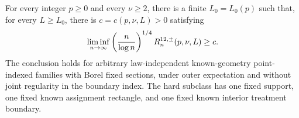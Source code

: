For every integer \(p\geq0\) and every \(\nu\geq2\), there is a finite \(L_0=L_0(p)\) such that, for every \(L\geq L_0\), there is \(c=c(p,\nu,L)>0\) satisfying
\[
 \liminf_{n\to\infty}\left({n\over\log n}\right)^{1/4}R^{12,\pm}_n(p,\nu,L)\geq c.
\]
The conclusion holds for arbitrary law-independent known-geometry point-indexed families with Borel fixed sections, under outer expectation and without joint regularity in the boundary index.  The hard subclass has one fixed support, one fixed known assignment rectangle, and one fixed known interior treatment boundary.